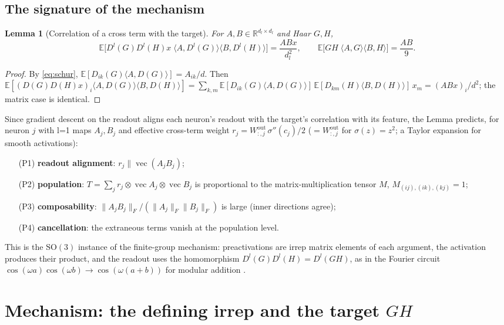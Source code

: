 \documentclass[a4paper,11pt]{article}
\newtheorem{lemma}[proposition]{Lemma}
\theoremstyle{remark}
\theoremstyle{definition}
\newcommand{\R}{\mathbb{R}}
\newcommand{\E}{\mathbb{E}}
\newcommand{\vect}{\operatorname{vec}}
\newcommand{\SO}{\mathrm{SO}(3)}
\newcommand{\ip}[2]{\langle #1, #2 \rangle}
\begin{document}
\subsection{The signature of the mechanism}

\begin{lemma}[Correlation of a cross term with the target]\label{lem:cross}
For $A,B\in\R^{d_l\times d_l}$ and Haar $G,H$,
\[
\E\bigl[D^l(G)D^l(H)x\;\ip{A}{D^l(G)}\ip{B}{D^l(H)}\bigr]=\frac{ABx}{d_l^2},
\qquad
\E\bigl[GH\;\ip{A}{G}\ip{B}{H}\bigr]=\frac{AB}{9}.
\]
\end{lemma}
\begin{proof}
By \eqref{eq:schur}, $\E[D_{ik}(G)\ip{A}{D(G)}]=A_{ik}/d$. Then
$\E[(D(G)D(H)x)_i\ip{A}{D(G)}\ip{B}{D(H)}]=\sum_{k,m}\E[D_{ik}(G)\ip{A}{D(G)}]\,
\E[D_{km}(H)\ip{B}{D(H)}]\,x_m=(ABx)_i/d^2$; the matrix case is identical.
\end{proof}

Since gradient descent on the readout aligns each neuron's readout with the
target's correlation with its feature, the Lemma predicts, for neuron $j$ with
l=1 maps $A_j,B_j$ and effective cross-term weight
$r_j=W^{\text{out}}_{:,j}\,\sigma''(c_j)/2$ ($=W^{\text{out}}_{:,j}$ for $\sigma(z)=z^2$;
a Taylor expansion for smooth activations):
\begin{itemize}
\item[(P1)] \textbf{readout alignment}: $r_j\parallel\vect(A_jB_j)$;
\item[(P2)] \textbf{population}: $T=\sum_jr_j\otimes\vect A_j\otimes\vect B_j$ is
  proportional to the matrix-multiplication tensor $M$, $M_{(ij),(ik),(kj)}=1$;
\item[(P3)] \textbf{composability}: $\|A_jB_j\|_F/(\|A_j\|_F\|B_j\|_F)$ is large
  (inner directions agree);
\item[(P4)] \textbf{cancellation}: the extraneous terms vanish at the
  population level.
\end{itemize}
This is the $\SO$ instance of the finite-group mechanism: preactivations are
irrep matrix elements of each argument, the activation produces their product,
and the readout uses the homomorphism $D^l(G)D^l(H)=D^l(GH)$, as in the
Fourier circuit $\cos(\omega a)\cos(\omega b)\to\cos(\omega(a+b))$ for modular
addition \cite{nanda2023progress}.

\section{Mechanism: the defining irrep and the target $GH$}
\label{sec:experiments}
\end{document}
